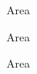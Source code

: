 \documentclass[a4paper]{article}
\begin{document}
\printVSLEventHeader{}{}
\begin{center}
\begin{vsltext}{3cm}{3.5cm}
Area \AreaA

\vspace{1cm}

Area \AreaB

\vspace{1cm}

Area \AreaC
\end{vsltext}

\end{center}
\end{document}
